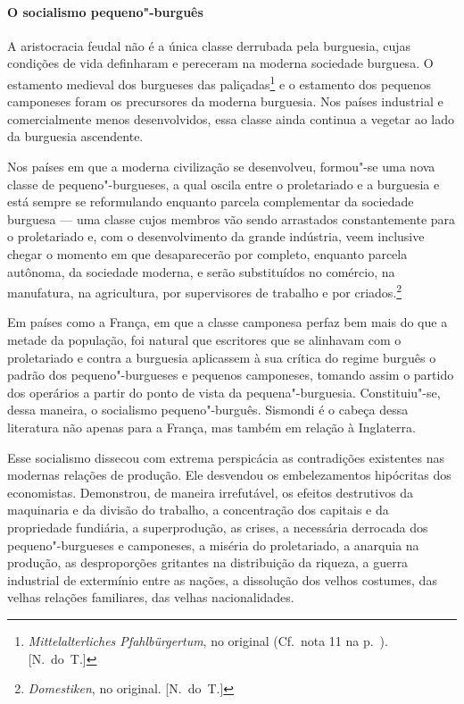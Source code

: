 \paragraph{O socialismo pequeno"-burguês}

A aristocracia feudal não é a única classe derrubada pela
burguesia, cujas condições de vida definharam e pereceram na moderna
sociedade burguesa. O estamento medieval dos burgueses das
paliçadas\footnote{ \textit{Mittelalterliches Pfahlbürgertum},
no original (Cf.~nota 11 na p.~\pageref{8}). [N.~do~T.]} e o estamento dos pequenos camponeses
foram os precursores da moderna burguesia. Nos países industrial e
comercialmente menos desenvolvidos, essa classe ainda continua a
vegetar ao lado da burguesia ascendente.

Nos países em que a moderna civilização se desenvolveu,
formou"-se uma nova classe de pequeno"-burgueses, a qual oscila entre
o proletariado e a burguesia e está sempre se reformulando enquanto
parcela complementar da sociedade burguesa  ---  uma classe cujos membros
vão sendo arrastados constantemente para o proletariado e, com o
desenvolvimento da grande indústria, veem inclusive chegar o momento em
que desaparecerão por completo, enquanto parcela autônoma, da sociedade
moderna, e serão substituídos no comércio, na manufatura, na
agricultura, por supervisores de trabalho e por
criados.\footnote{ \textit{Domestiken}, no original. [N.~do~T.]}

Em países como a França, em que a classe camponesa perfaz bem mais do
que a metade da população, foi natural que escritores que se alinhavam
com o proletariado e contra a burguesia aplicassem à sua crítica do
regime burguês o padrão dos pequeno"-burgueses e pequenos camponeses,
tomando assim o partido dos operários a partir do ponto de vista da
pequena"-burguesia. Constituiu"-se, dessa maneira, o socialismo
pequeno"-burguês. Sismondi é o cabeça dessa literatura não apenas para
a França, mas também em relação à Inglaterra.

Esse socialismo dissecou com extrema perspicácia as contradições
existentes nas modernas relações de produção. Ele desvendou os
embelezamentos hipócritas dos economistas. Demonstrou, de maneira
irrefutável, os efeitos destrutivos da maquinaria e da divisão do
trabalho, a concentração dos capitais e da propriedade fundiária, a
superprodução, as crises, a necessária derrocada dos pequeno"-burgueses
e camponeses, a miséria do proletariado, a anarquia na produção, as
desproporções gritantes na distribuição da riqueza, a guerra industrial
de extermínio entre as nações, a dissolução dos velhos costumes, das
velhas relações familiares, das velhas nacionalidades.

